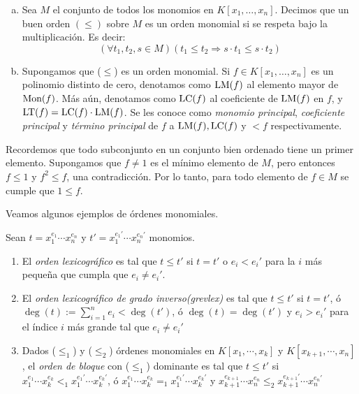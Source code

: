 \begin{definition}
\begin{enumerate}[a)]
\item Sea $M$ el conjunto de todos los monomios en $K[x_1, \dots, x_n]$. Decimos que un buen orden $(\leq)$ sobre $M$ es un orden monomial si se respeta bajo la multiplicación. Es decir: 
$$ (\forall t_1, t_2, s \in M)(t_1 \leq  t_2 \Rightarrow s\cdot t_1 \leq s\cdot t_2) $$
\item Supongamos que ($\leq$) es un orden monomial. Si $f \in K[x_1, \dots, x_n]$ es un polinomio distinto de cero, denotamos como $\textrm{LM}(f)$ al elemento mayor de $\textrm{Mon}(f)$. Más aún, denotamos como $\textrm{LC}(f)$ al coeficiente de $\textrm{LM}(f)$ en $f$, y $\textrm{LT}(f) = \textrm{LC}(f)\cdot\textrm{LM}(f)$. Se les conoce como \emph{monomio principal}, \emph{coeficiente principal} y \emph{término principal} de $f$ a $\textrm{LM}(f), \textrm{LC}(f)$ y $\lt{f}$ respectivamente.
\end{enumerate}
\end{definition}

Recordemos que todo subconjunto en un conjunto bien ordenado tiene un primer elemento. Supongamos que $f \neq 1$ es el mínimo elemento de $M$, pero entonces $f \leq 1$ y $f^2 \leq f$, una contradicción. Por lo tanto, para todo elemento de $f \in M$ se cumple que $1 \leq f$.



Veamos algunos ejemplos de órdenes monomiales.

\begin{example} Sean $t = x_1^{e_1}\cdots x_n^{e_n}$ y $t' = x_1^{e_1'}\cdots x_n^{e_n'}$ monomios.
\begin{enumerate} [(1)]
\item El \emph{orden lexicográfico} es tal que $t \leq t'$ si $t = t'$ o $e_i < e_i'$ para la $i$ más pequeña que cumpla que $e_i \neq e_i'$.
\item El \emph{orden lexicográfico de grado inverso(grevlex)} es tal que $t \leq t'$ si $t = t'$, ó $\deg{(t)} := \sum_{i=1}^n e_i < \deg{(t')}$, ó $\deg{(t)} = \deg{(t')}$ y $e_i > e_i'$ para el índice $i$ más grande tal que $e_i \neq e_i'$
\item Dados ($\leq_1$) y ($\leq_2$) órdenes monomiales en $K[x_1,\cdots,x_k]$ y $K[x_{k+1},\cdots,x_n]$, el \emph{orden de bloque} con ($\leq_1$) dominante es tal que $t \leq t'$ si $x_1^{e_1}\cdots x_k^{e_k} <_1 x_1^{e_1'}\cdots x_k^{e_k'}$, ó $x_1^{e_1}\cdots x_k^{e_k} =_1 x_1^{e_1'}\cdots x_k^{e_k'}$ y  $x_{k+1}^{e_{k+1}}\cdots x_n^{e_n} \leq_2 x_{k+1}^{e_{k+1}'}\cdots x_n^{e_n'}$
\end{enumerate}
\end{example}

